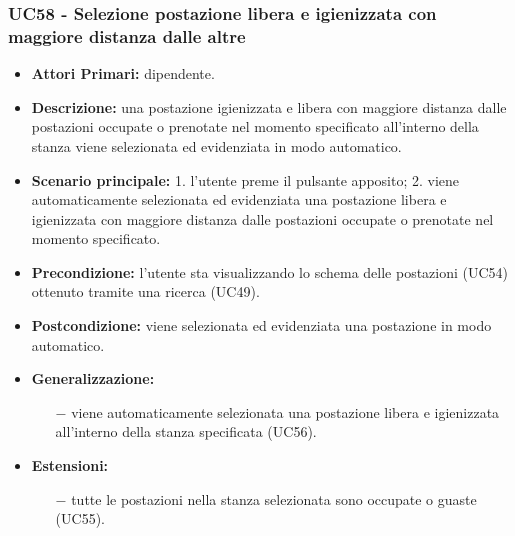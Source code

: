 \subsubsection{ UC58 - Selezione postazione libera e igienizzata con maggiore distanza dalle altre}
\begin{itemize}
	\item\textbf{Attori Primari:} dipendente.
	\item\textbf{Descrizione:} una postazione igienizzata e libera con maggiore distanza dalle postazioni occupate o prenotate nel momento specificato all'interno della stanza viene selezionata ed evidenziata in modo automatico.
	\item\textbf{Scenario principale:}
	1. l'utente preme il pulsante apposito;
	2. viene automaticamente selezionata ed evidenziata una postazione libera e igienizzata con maggiore distanza dalle postazioni occupate o prenotate nel momento specificato.
	\item\textbf{Precondizione:} l’utente sta visualizzando lo schema delle postazioni (UC54) ottenuto tramite una ricerca (UC49).
	\item\textbf{Postcondizione:} viene selezionata ed evidenziata una postazione in modo automatico.
	\item\textbf{Generalizzazione:}
	\begin{itemize}
		\item[$-$] viene automaticamente selezionata una postazione libera e igienizzata all'interno della stanza specificata (UC56).
	\end{itemize}
	\item\textbf{Estensioni:}
	\begin{itemize}
		\item[$-$] tutte le postazioni nella stanza selezionata sono occupate o guaste (UC55).
	\end{itemize}
\end{itemize}

